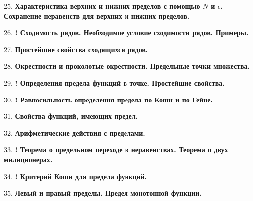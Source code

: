 \documentclass[12pt]{article}
\begin{document}
25. \textbf{Характеристика верхних и нижних пределов с помощью $N$ и $\epsilon$. Сохранение неравенств для верхних и нижних пределов.}

26. \textbf{! Сходимость рядов. Необходимое условие сходимости рядов. Примеры.}

27. \textbf{Простейшие свойства сходящихся рядов.}

28. \textbf{Окрестности и проколотые окрестности. Предельные точки множества.}

29. \textbf{! Определения предела функций в точке. Простейшие свойства.}

30. \textbf{! Равносильность определения предела по Коши и по Гейне.}

31. \textbf{Свойства функций, имеющих предел.}

32. \textbf{Арифметические действия с пределами.}

33. \textbf{! Теорема о предельном переходе в неравенствах. Теорема о двух милиционерах.}

34. \textbf{! Критерий Коши для предела функций.}

35. \textbf{Левый и правый пределы. Предел монотонной функции.}
\end{document}
